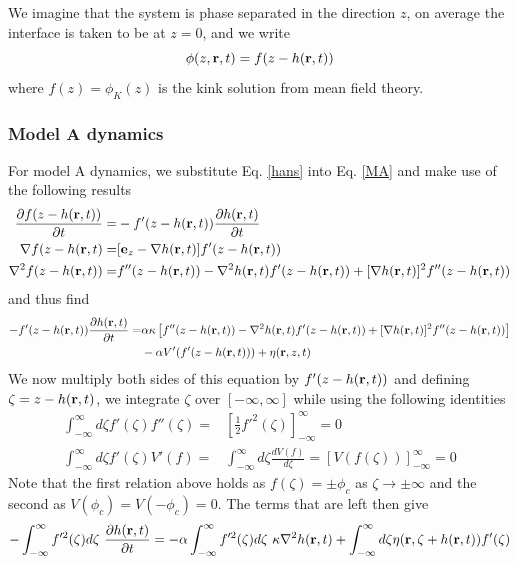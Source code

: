 We imagine that the system is phase separated in the direction $z$, on average the interface is taken to be at $z=0$, and we write
\begin{equation}
\phi(z,{\bf r},t) = f(z-h({\bf r},t))
\label{hans}
\end{equation}
where $f(z)=\phi_K(z)$ is the kink solution from mean field theory.

\subsubsection{Model A dynamics}

For model A dynamics, we substitute Eq. \eqref{hans} into Eq. \eqref{MA} and make use of the following results
\begin{align*}
\frac{\partial f(z-h({\bf r},t))}{\partial t} =& -f'(z-h({\bf r},t))\frac{\partial h({\bf r},t)}{\partial t}\\
\nabla f(z-h({\bf r},t) =& [{\bf e}_z-\nabla h({\bf r},t)]f'(z-h({\bf r},t)) \\
\nabla^2 f(z-h({\bf r},t))=& f''(z-h({\bf r},t))- \nabla^2 h({\bf r},t)f'(z-h({\bf r},t))+ [\nabla h({\bf r},t)]^2 f''(z-h({\bf r},t))
\end{align*}
and thus find
\begin{align*}
-f'(z-h({\bf r},t))\frac{\partial h({\bf r},t)}{\partial t}=& \alpha\kappa 
\left[ f''(z-h({\bf r},t))- \nabla^2 h({\bf r},t)f'(z-h({\bf r},t))+ [\nabla h({\bf r},t)]^2 f''(z-h({\bf r},t))\right] \\
& - \alpha V'(f'(z-h({\bf r},t))) + \eta({\bf r},z,t)
\end{align*}
We now multiply both sides of this equation by $f'(z-h({\bf r},t))$ and defining $\zeta=z-h({\bf r},t)$, we integrate $\zeta$ over $[-\infty,\infty]$ while using the following identities
\begin{align*}
\int_{-\infty}^\infty d\zeta f'(\zeta)f''(\zeta) =& [\frac{1}{2}f'^2(\zeta)]_{-\infty}^\infty =0 \\
\int_{-\infty}^\infty d\zeta f'(\zeta) V'(f) =& \int_{-\infty}^\infty d\zeta\frac{d V(f)}{d\zeta} =[V(f(\zeta))]_{-\infty}^\infty=0
\end{align*} 
Note that the first relation above holds as $f(\zeta)=\pm \phi_c$ as $\zeta\to\pm \infty$ and the second as
$V(\phi_c)=V(-\phi_c)=0$.
The terms that are left then give
\begin{equation}
-\int_{-\infty}^\infty f'^2(\zeta)d\zeta\ \frac{\partial h(\br,t)}{\partial t}
= -\alpha\int_{-\infty}^\infty f'^2(\zeta)d\zeta \ \kappa \nabla^2 h(\br,t) + \int_{-\infty}^\infty d\zeta \eta(\br,\zeta+ h(\br,t))f'(\zeta)
\end{equation}
